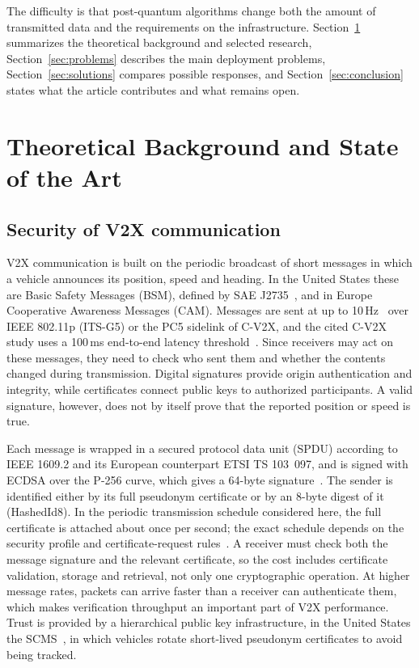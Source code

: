 \documentclass[11pt,a4paper]{article}
\begin{document}
The difficulty is that post-quantum algorithms change both the amount of transmitted data and
the requirements on the infrastructure. Section~\ref{sec:theory} summarizes the theoretical
background and selected research, Section~\ref{sec:problems} describes the main deployment
problems, Section~\ref{sec:solutions} compares possible responses, and
Section~\ref{sec:conclusion} states what the article contributes and what remains open.

\section{Theoretical Background and State of the Art}
\label{sec:theory}

\subsection{Security of V2X communication}

V2X communication is built on the periodic broadcast of short messages in which a vehicle
announces its position, speed and heading. In the United States these are Basic Safety Messages
(BSM), defined by SAE J2735~\cite{saej2735}, and in Europe Cooperative Awareness Messages
(CAM). Messages are sent at up to 10\,Hz~\cite{kenney} over IEEE 802.11p (ITS-G5) or the PC5
sidelink of C-V2X, and the cited C-V2X study uses a 100\,ms end-to-end latency
threshold~\cite{abrar}. Since receivers may act on these messages, they need to check who sent
them and whether the contents changed during transmission. Digital signatures provide origin
authentication and integrity, while certificates connect public keys to authorized participants.
A valid signature, however, does not by itself prove that the reported position or speed is true.

Each message is wrapped in a secured protocol data unit (SPDU) according to IEEE 1609.2 and
its European counterpart ETSI TS 103~097, and is signed with ECDSA over the P-256 curve, which
gives a 64-byte signature~\cite{etsi097r2,ieee1609}. The sender is identified either by its full
pseudonym certificate or by an 8-byte digest of it (HashedId8). In the periodic transmission
schedule considered here, the full certificate is attached about once per second; the exact
schedule depends on the security profile and certificate-request rules~\cite{abrar,kenney}. A
receiver must check both the message signature and the relevant certificate, so the cost
includes certificate validation, storage and retrieval, not only one cryptographic operation. At
higher message rates, packets can arrive faster than a receiver can authenticate them, which
makes verification throughput an important part of V2X performance. Trust is provided by a
hierarchical public key infrastructure, in the United States the SCMS~\cite{whyte}, in which
vehicles rotate short-lived pseudonym certificates to avoid being tracked.
\end{document}
